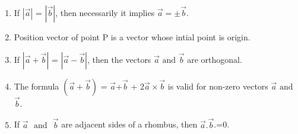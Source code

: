 \documentclass{article}
\providecommand{\abs}[1]{\left\vert#1\right\vert}
\begin{document}
\begin{enumerate}

\item If $\abs{\vec{a}}$ = $\abs{\vec{b}}$, then necessarily it implies $\vec{a}=\pm\vec{b}$.


\item Position vector of point P is a vector whose intial point is origin.


\item If $\abs{\vec{a}+\vec{b}}$ = $\abs{\vec{a}-\vec{b}}$, then the vectors $\vec{a}$ $\text {and}$ $\vec{b}$ are orthogonal.


\item The formula $(\vec{a}+\vec{b})$ = $\vec{a}$+$\vec{b}$ + 2$\vec{a}\times\vec{b}$ is valid for non-zero vectors $\vec{a}$ $\text{and}$ $\vec{b}$.


\item If $\vec{a}$ $\text{ and }$ $\vec{b}$ are adjacent sides of a rhombus, then $\vec{a}.\vec{b}$.=0.
	\end{enumerate}
\end{document}
